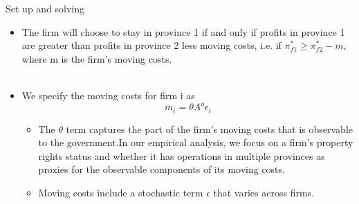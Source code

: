 \documentclass{beamer}
\begin{document}
\begin{frame}{Set up and solving}

\begin{itemize}
\item The firm will choose to stay in province 1 if and only if profits in province 1 are greater than profits in province 2 less moving costs, i.e. if $\pi _{f1}^{*}\geqslant \pi _{f2}^{*}-m $, where m is the firm's moving costs.\\~

\item We specify the moving costs for firm i as
\begin{equation*}
m_i=\theta A^{\eta}\epsilon _i
\end{equation*}

\begin{itemize}
\item The $\theta$ term captures the part of the firm's moving costs that is observable to the government.In our empirical analysis, we focus on a firm's property rights status and whether it has operations in multiple provinces
as proxies for the observable components of its moving costs.
\item Moving costs include a stochastic term $\epsilon$ that varies across firms.

\end{itemize}

\end{itemize}

\end{frame}
\end{document}
